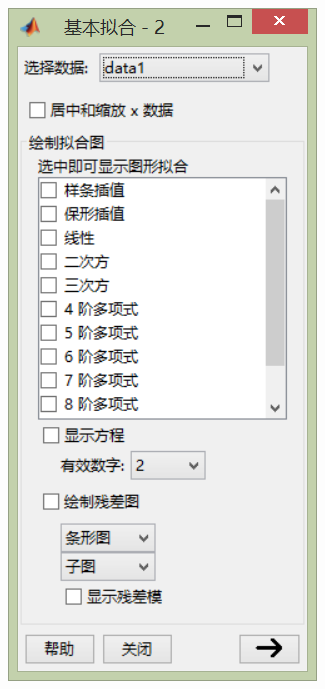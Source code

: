        \begin{figure}[H]
        \centering
        \begin{subfigure}[b]{0.2\textwidth}
            \includegraphics[width=\textwidth]{images/21.jpg}

\end{subfigure}
\end{figure}
